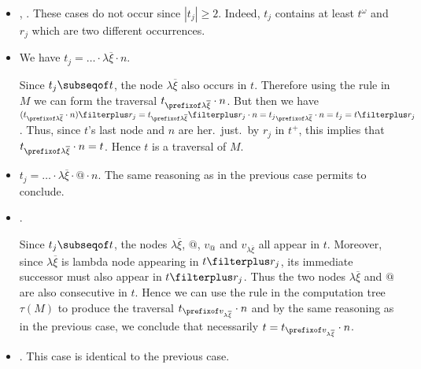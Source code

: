   \begin{itemize}
    \item {}, . These cases do not occur since $|t_j| \geq 2$. Indeed, $t_j$ contains at least $t^\omega$ and $r_j$ which are two different occurrences.

    \item {}
        We have  $t_j = \ldots \cdot \lambda \overline{\xi} \cdot n$.

        Since $t_j \subseqof t$, the node $\lambda \overline{\xi}$ also occurs in $t$.
        Therefore using the rule  in $M$ we can form the traversal
        $t_{\prefixof \lambda \overline{\xi}} \cdot n$. But then we have $(t_{\prefixof \lambda \overline{\xi}} \cdot n) \filterplus r_j =
        t_{\prefixof \lambda \overline{\xi}} \filterplus r_j \cdot n
        = {t_j}_{\prefixof \lambda \overline{\xi}} \cdot n = t_j = t \filterplus r_j$.
        Thus, since $t$'s last node and $n$ are her.\ just.\ by $r_j$ in $t^+$, this implies that
         $t_{\prefixof \lambda \overline{\xi}} \cdot n = t$.
        Hence $t$ is a traversal of $M$.

    \item {} $t_j = \ldots \cdot \lambda \overline{\xi} \cdot @ \cdot n$.
    The same reasoning as in the previous case permits to conclude.


    \item {} .

    Since $t_j\subseqof t$, the nodes
    $\lambda \overline{\xi}$, $@$, $v_@$ and $v_{\lambda \overline{\xi}}$
    all appear in $t$. Moreover, since $\lambda \overline{\xi}$ is lambda node
    appearing in $t\filterplus r_j$, its immediate successor must also appear in
    $t\filterplus r_j$. Thus the two nodes $\lambda \overline{\xi}$ and $@$ are also consecutive in $t$. Hence
    we can use the rule  in the computation tree $\tau(M)$ to produce
    the traversal $t_{\prefixof v_{\lambda \overline{\xi}}} \cdot n$ and by the same reasoning as in the previous case, we
    conclude that necessarily $t = t_{\prefixof v_{\lambda \overline{\xi}}} \cdot n$.

    \item {} . This case is identical to the previous case.


\end{itemize}
